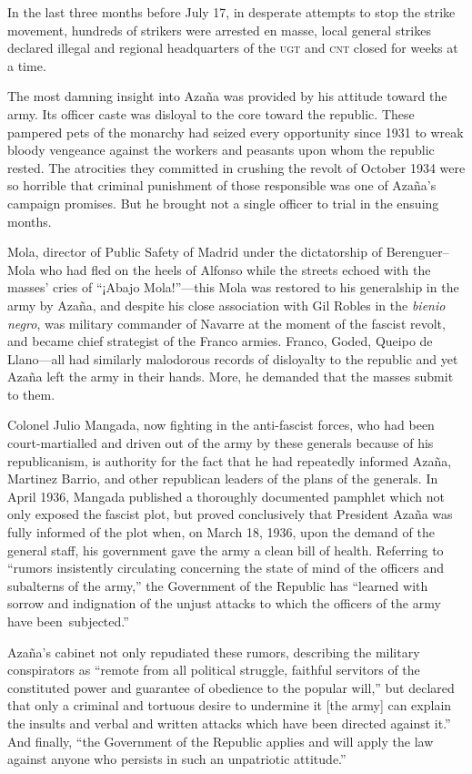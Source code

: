 In the last three months before July 17, in desperate attempts to stop the strike movement, hundreds of strikers were arrested en masse, local general strikes declared illegal and regional headquarters of the \textsc{ugt} and \textsc{cnt} closed for weeks at a time.

The most damning insight into Azaña was provided by his attitude toward the army. Its officer caste was disloyal to the core toward the republic. These pampered pets of the monarchy had seized every opportunity since 1931 to wreak bloody vengeance against the workers and peasants upon whom the republic rested. The atrocities they committed in crushing the revolt of October 1934 were so horrible that criminal punishment of those responsible was one of Azaña’s campaign promises. But he brought not a single officer to trial in the ensuing months.

Mola, director of Public Safety of Madrid under the dictatorship of Berenguer--Mola who had fled on the heels of Alfonso while the streets echoed with the masses’ cries of ``¡Abajo Mola!''---this Mola was restored to his generalship in the army by Azaña, and despite his close association with Gil Robles in the \emph{bienio negro}, was military commander of Navarre at the moment of the fascist revolt, and became chief strategist of the Franco armies. Franco, Goded, Queipo de Llano---all had similarly malodorous records of disloyalty to the republic and yet Azaña left the army in their hands. More, he demanded that the masses submit to them.

Colonel Julio Mangada, now fighting in the anti-fascist forces, who had been court-martialled and driven out of the army by these generals because of his republicanism, is authority for the fact that he had repeatedly informed Azaña, Martinez Barrio, and other republican leaders of the plans of the generals. In April 1936, Mangada published a thoroughly documented pamphlet which not only exposed the fascist plot, but proved conclusively that President Azaña was fully informed of the plot when, on March 18, 1936, upon the demand of the general staff, his government gave the army a clean bill of health. Referring to ``rumors insistently circulating concerning the state of mind of the officers and subalterns of the army,'' the Government of the Republic has ``learned with sorrow and indignation of the unjust attacks to which the officers of the army have been~subjected.''

Azaña’s cabinet not only repudiated these rumors, describing the military conspirators as ``remote from all political struggle, faithful servitors of the constituted power and guarantee of obedience to the popular will,'' but declared that only a criminal and tortuous desire to undermine it [the army] can explain the insults and verbal and written attacks which have been directed against it.'' And finally, ``the Government of the Republic applies and will apply the law against anyone who persists in such an unpatriotic attitude.''

